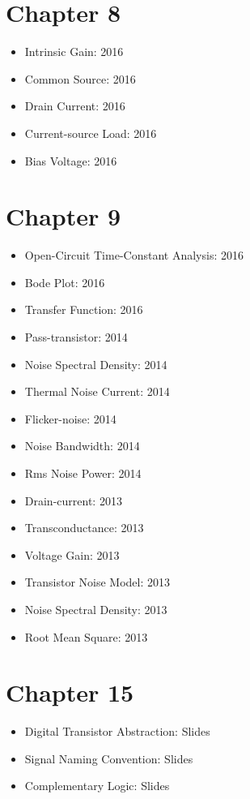 \documentclass[twocolumn]{article}
\begin{document}
  \section*{Chapter 8}
    \begin{itemize}
      \item Intrinsic Gain: 2016
      \item Common Source: 2016
      \item Drain Current: 2016
      \item Current-source Load: 2016
      \item Bias Voltage: 2016
    \end{itemize}
  \section*{Chapter 9}
    \begin{itemize}
      \item Open-Circuit Time-Constant Analysis: 2016
      \item Bode Plot: 2016
      \item Transfer Function: 2016

      \item Pass-transistor: 2014
      \item Noise Spectral Density: 2014
      \item Thermal Noise Current: 2014
      \item Flicker-noise: 2014
      \item Noise Bandwidth: 2014
      \item Rms Noise Power: 2014

      \item Drain-current: 2013
      \item Transconductance: 2013
      \item Voltage Gain: 2013
      \item Transistor Noise Model: 2013
      \item Noise Spectral Density: 2013
      \item Root Mean Square: 2013
    \end{itemize}
  \section*{Chapter 15}
    \begin{itemize}
      \item Digital Transistor Abstraction: Slides
      \item Signal Naming Convention: Slides
      \item Complementary Logic: Slides
    \end{itemize}
\end{document}
